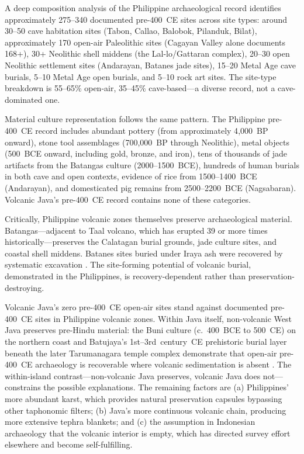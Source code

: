 \documentclass[12pt,a4paper]{article}
\begin{document}
A deep composition analysis of the Philippine archaeological record \citep[E201]{amien_e201} identifies approximately 275--340 documented pre-400~CE sites across site types: around 30--50 cave habitation sites (Tabon, Callao, Balobok, Pilanduk, Bilat), approximately 170 open-air Paleolithic sites (Cagayan Valley alone documents 168+), 30+ Neolithic shell middens (the Lal-lo/Gattaran complex), 20--30 open Neolithic settlement sites (Andarayan, Batanes jade sites), 15--20 Metal Age cave burials, 5--10 Metal Age open burials, and 5--10 rock art sites. The site-type breakdown is 55--65\% open-air, 35--45\% cave-based---a diverse record, not a cave-dominated one.

Material culture representation follows the same pattern. The Philippine pre-400~CE record includes abundant pottery (from approximately 4{,}000~BP onward), stone tool assemblages (700{,}000~BP through Neolithic), metal objects (500~BCE onward, including gold, bronze, and iron), tens of thousands of jade artifacts from the Batangas culture (2000--1500~BCE), hundreds of human burials in both cave and open contexts, evidence of rice from 1500--1400~BCE (Andarayan), and domesticated pig remains from 2500--2200~BCE (Nagsabaran). Volcanic Java's pre-400~CE record contains none of these categories.

Critically, Philippine volcanic zones themselves preserve archaeological material. Batangas---adjacent to Taal volcano, which has erupted 39 or more times historically---preserves the Calatagan burial grounds, jade culture sites, and coastal shell middens. Batanes sites buried under Iraya ash were recovered by systematic excavation \citep{bellwood_dizon2013}. The site-forming potential of volcanic burial, demonstrated in the Philippines, is recovery-dependent rather than preservation-destroying.

Volcanic Java's zero pre-400~CE open-air sites stand against documented pre-400~CE sites in Philippine volcanic zones. Within Java itself, non-volcanic West Java preserves pre-Hindu material: the Buni culture (c.~400~BCE to 500~CE) on the northern coast and Batujaya's 1st--3rd~century~CE prehistoric burial layer beneath the later Tarumanagara temple complex demonstrate that open-air pre-400~CE archaeology is recoverable where volcanic sedimentation is absent \citep{manguin2011,wibisono1994}. The within-island contrast---non-volcanic Java preserves, volcanic Java does not---constrains the possible explanations. The remaining factors are (a) Philippines' more abundant karst, which provides natural preservation capsules bypassing other taphonomic filters; (b) Java's more continuous volcanic chain, producing more extensive tephra blankets; and (c) the assumption in Indonesian archaeology that the volcanic interior is empty, which has directed survey effort elsewhere and become self-fulfilling.
\end{document}
